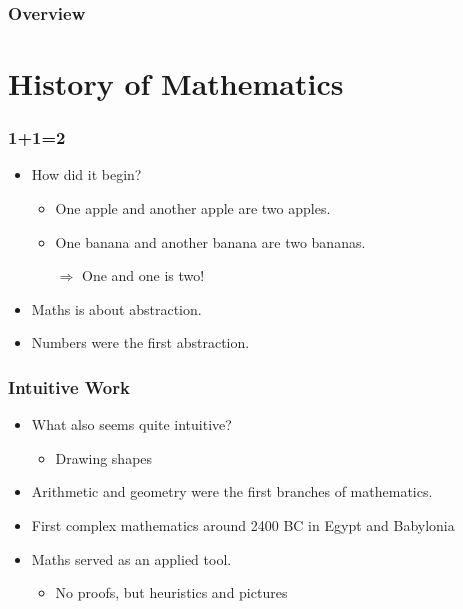 \documentclass{beamer}
\begin{document}

\begin{frame}
    \frametitle{Overview} 
        \tableofcontents
\end{frame}

\section{History of Mathematics}
\begin{frame}
    \frametitle{1+1=2}
    \begin{itemize}[<+->]
	\item How did it begin?
	\begin{itemize}
		\item One apple and another apple are two apples.
		\item One banana and another banana are two bananas.
		\item[$\Rightarrow$] One and one is two!
	\end{itemize}
	\item Maths is about abstraction.
	\item Numbers were the first abstraction.
    \end{itemize}
\end{frame}
\begin{frame}
    \frametitle{Intuitive Work}
    \begin{itemize}[<+->]
	\item What also seems quite intuitive?
	\begin{itemize}
		\item Drawing shapes
	\end{itemize}
	\item Arithmetic and geometry were the first branches of mathematics.
	\item First complex mathematics around 2400 BC in Egypt and Babylonia
	\item Maths served as an applied tool.
	\begin{itemize}
		\item No proofs, but heuristics and pictures
	\end{itemize}
    \end{itemize}
\end{frame}
\end{document}

